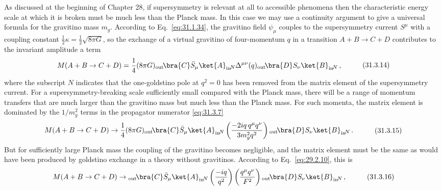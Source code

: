 As discussed at the beginning of Chapter 28, if supersymmetry is relevant
at all to accessible phenomena then the characteristic energy scale at
which it is broken must be much less than the Planck mass. In this case we
may use a continuity argument to give a universal formula for the
gravitino mass \(m_g\). According to Eq.~\eqref{eq:31.1.34}, the gravitino
field \(\psi_\mu\) couples to the supersymmetry current \(S^\mu\) with a
coupling constant \(\frac12\kappa=\frac12\sqrt{8\pi G}\), so the exchange
of a virtual gravitino of four-momentum \(q\) in a transition
\(A+B\to C+D\) contributes to the invariant amplitude a term
\begin{equation}
  \begin{aligned}
  M(A+B\to C+D)
  ={}&\frac14(8\pi G)
  {}_{\mathrm{out}}\!\bra{C}\bar S_\mu\ket{A}_{\mathrm{in}}\!{}_{N}
  \Delta^{\mu\nu}(q)
  {}_{\mathrm{out}}\!\bra{D}S_\nu\ket{B}_{\mathrm{in}}\!{}_{N}\,,
  \end{aligned}
  \tag{31.3.14}\label{eq:31.3.14}
\end{equation}
where the subscript \(N\) indicates that the one-goldstino pole at
\(q^2=0\) has been removed from the matrix element of the supersymmetry
current. For a supersymmetry-breaking scale sufficiently small compared
with the Planck mass, there will be a range of momentum transfers that are
much larger than the gravitino mass but much less than the Planck mass.
For such momenta, the matrix element is dominated by the \(1/m_g^2\)
terms in the propagator numerator \eqref{eq:31.3.7}
\begin{equation}
  \begin{aligned}
  M(A+B\to C+D)\to{}&
  \frac14(8\pi G)
  {}_{\mathrm{out}}\!\bra{C}\bar S_\mu\ket{A}_{\mathrm{in}}\!{}_{N}
  \left(\frac{-2i\sl{q}\,q^\mu q^\nu}{3m_g^2q^2}\right)
  {}_{\mathrm{out}}\!\bra{D}S_\nu\ket{B}_{\mathrm{in}}\!{}_{N}\,.
  \end{aligned}
  \tag{31.3.15}\label{eq:31.3.15}
\end{equation}
But for sufficiently large Planck mass the coupling of the gravitino
becomes negligible, and the matrix element must be the same as would have
been produced by goldstino exchange in a theory without gravitinos.
According to Eq.~\eqref{eq:29.2.10}, this is
\begin{equation}
  \begin{aligned}
  M(A+B\to C+D)\to{}&
  {}_{\mathrm{out}}\!\bra{C}\bar S_\mu\ket{A}_{\mathrm{in}}\!{}_{N}
  \left(\frac{-i\sl{q}}{q^2}\right)
  \left(\frac{q^\mu q^\nu}{F^2}\right)
  {}_{\mathrm{out}}\!\bra{D}S_\nu\ket{B}_{\mathrm{in}}\!{}_{N}\,,
  \end{aligned}
  \tag{31.3.16}\label{eq:31.3.16}
\end{equation}
